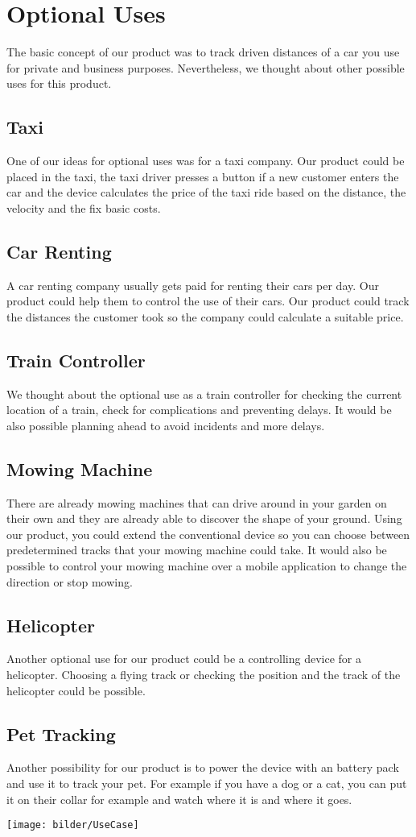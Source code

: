 \chapter{Optional Uses}
The basic concept of our product was to track driven distances of a car you use for private and business purposes. Nevertheless, we thought about other possible uses for this product.
\section{Taxi}
One of our ideas for optional uses was for a taxi company. Our product could be placed in the taxi, the taxi driver presses a button if a new customer enters the car and the device calculates the price of the taxi ride based on the distance, the velocity and the fix basic costs. 
\section{Car Renting}
A car renting company usually gets paid for renting their cars per day. Our product could help them to control the use of their cars. Our product could track the distances the customer took so the company could calculate a suitable price. 
\section{Train Controller}
We thought about the optional use as a train controller for checking the current location of a train, check for complications and preventing delays. It would be also possible planning ahead to avoid incidents and more delays.
\section{Mowing Machine}
There are already mowing machines that can drive around in your garden on their own and they are already able to discover the shape of your ground. Using our product, you could extend the conventional device so you can choose between predetermined tracks that your mowing machine could take. It would also be possible to control your mowing machine over a mobile application to change the direction or stop mowing.
\section{Helicopter}
Another optional use for our product could be a controlling device for a helicopter. Choosing a flying track or checking the position and the track of the helicopter could be possible.
\section{Pet Tracking}
Another possibility for our product is to power the device with an battery pack and use it to track your pet. For example if you have a dog or a cat, you can put it on their collar for example and watch where it is and where it goes.
\begin{center}
\texttt{[image: bilder/UseCase]}
\end{center}
